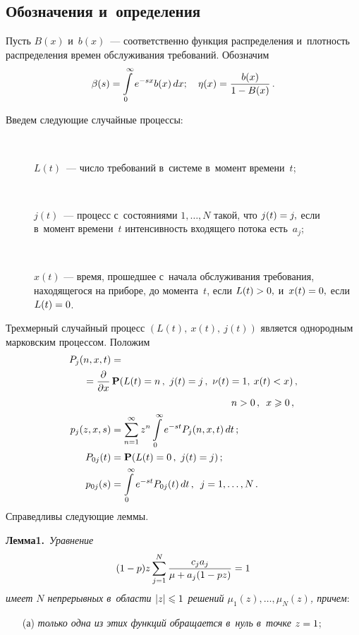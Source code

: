 \begin{multicols}{2}
\section{Обозначения и~определения}

Пусть $B(x)$ и~$b(x)$~--- соответственно функция распределения и~плотность
 распределения времен обслуживания требований.  Обозначим
  $$
  \beta(s)=\int\limits_0^{\infty}e^{-sx}b(x)\,dx;\quad
   \eta(x)=\displaystyle\frac{\displaystyle b(x)\mathstrut}{\displaystyle 1-B(x)\mathstrut}\,.
$$

Введем следующие случайные процессы:
\begin{description}
\item[\,] $L(t)$~--- число требований в~системе в~момент времени~$t$;
\item[\,] 
$j(t)$~--- процесс с~состояниями $1,\ldots,N$ такой, что $j(t)\hm=j,$ если  
в~момент времени~$t$ интенсивность входящего потока есть~$a_j$;
\item[\,] 
$x(t)$ --- время, прошедшее с~начала обслуживания требования, находящегося на приборе,
 до момента~$t$, если $L(t)\hm>0,$ и~$x(t)\hm=0,$ если $L(t)\hm=0$.
 \end{description}

Трехмерный случайный процесс $(L(t),\:x(t),\:j(t))$ является однородным 
марковским процессом. Положим
\begin{align*}
P_j(n,x,t)&={}\\
&\hspace*{-28pt}{}=\fr{\partial}{\partial x}\,\mathbf{P}(L(t)=n\,,
\ 
j(t)=j\,,\
\nu(t)=1,\:x(t)<x)\,,\\
&\hspace*{43mm}n>0\,,\enskip x\geqslant 0\,,
\\
p_j(z,x,s)&=\sum\limits_{n=1}^{\infty}z^n\int\limits_0^{\infty}e^{-st}P_j(n,x,t)\,dt\,;
\\
P_{0j}(t)&=\mathbf{P}(L(t)=0\,, \ j(t)=j)\,;\\
p_{0j}(s)&=\int\limits_0^{\infty}e^{-st}P_{0j}(t)\,dt\,,\enskip
 j=1,\ldots,N\,.
\end{align*}
Справедливы следующие леммы.

\smallskip

\noindent
\textbf{Лемма1.}\
\textit{Уравнение
\begin{equation}
\label{1}
(1-p)z\sum\limits_{j=1}^{N}\displaystyle\frac{\displaystyle c_ja_j\mathstrut}{\displaystyle \mu+a_j(1-pz)\mathstrut}=1
\end{equation}
имеет $N$ непрерывных в~области $|z|\hm\leqslant 1$ решений 
$\mu_1(z),\ldots,\mu_N(z)$, причем}:
\begin{itemize}
\item[(а)] \textit{только одна из этих функций  обращается в~нуль в~точке} $z\hm=1$;


\end{itemize}
\end{multicols}
